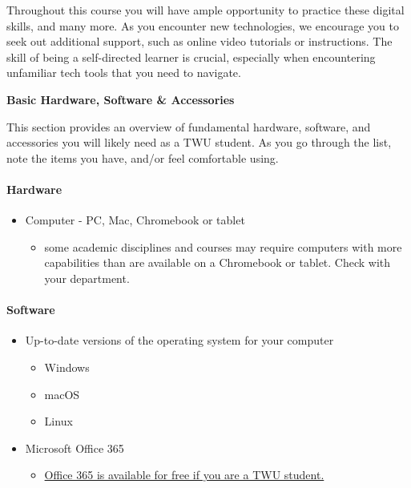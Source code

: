 \documentclass[
]{book}
\providecommand{\tightlist}{%
  \setlength{\itemsep}{0pt}\setlength{\parskip}{0pt}}
\theoremstyle{definition}
\theoremstyle{definition}
\theoremstyle{definition}
\theoremstyle{definition}
\theoremstyle{remark}
\begin{document}
Throughout this course you will have ample opportunity to practice these digital skills, and many more. As you encounter new technologies, we encourage you to seek out additional support, such as online video tutorials or instructions. The skill of being a self-directed learner is crucial, especially when encountering unfamiliar tech tools that you need to navigate.

\textbf{Basic Hardware, Software \& Accessories}

This section provides an overview of fundamental hardware, software, and accessories you will likely need as a TWU student. As you go through the list, note the items you have, and/or feel comfortable using.

\hypertarget{hardware}{%
\paragraph*{Hardware}\label{hardware}}

\begin{itemize}
\tightlist
\item
  Computer - PC, Mac, Chromebook or tablet

  \begin{itemize}
  \tightlist
  \item
    some academic disciplines and courses may require computers with more capabilities than are available on a Chromebook or tablet. Check with your department.
  \end{itemize}
\end{itemize}

\hypertarget{software}{%
\paragraph*{Software}\label{software}}

\begin{itemize}
\tightlist
\item
  Up-to-date versions of the operating system for your computer

  \begin{itemize}
  \tightlist
  \item
    Windows
  \item
    macOS
  \item
    Linux\\
  \end{itemize}
\item
  Microsoft Office 365

  \begin{itemize}
  \tightlist
  \item
    \href{https://trinitywestern.teamdynamix.com/TDClient/1904/Portal/KB/ArticleDet?ID=15119}{Office 365 is available for free if you are a TWU student.}
  \end{itemize}
\end{itemize}
\end{document}
